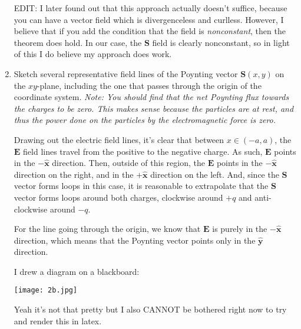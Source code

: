 \documentclass[10pt]{article}
\begin{document}
\begin{enumerate}[label=(\alph*)]
\begin{solution}
				EDIT: I later found out that this approach actually doesn't suffice, because you can have a
				vector field which is divergenceless and curlless. However, I believe that if you add the
				condition that the field is \textit{nonconstant}, then the theorem does hold. In our case,
				the \( \mathbf{S} \) field is clearly nonconstant, so in light of this I do believe my
				approach does work.  
			\end{solution}
		\item Sketch several representative field lines of the Poynting vector \( \mathbf{S}(x, y) \) on the
			\( xy \)-plane, including the one that passes through the origin of the coordinate system.
			\textit{Note: You should find that the net Poynting flux towards the charges to be zero. This
				makes sense because the particles are at rest, and thus the power done on the particles by
			the electromagnetic force is zero.}

			\begin{solution}
				Drawing out the electric field lines, it's clear that between \( x \in (-a, a) \), the \(
				\mathbf{E} \) field lines travel from the positive to the negative charge. As such, \(
				\mathbf{E} \) points in the \( -\hat{\mathbf{x}} \) direction. Then, outside of this region,
				the \( \mathbf{E} \) points in the \( -\hat{\mathbf{x}} \) direction on the right, and in the
				\( +\hat{\mathbf{x}} \) direction on the left. And, since the \( \mathbf{S} \) vector forms
				loops in this case, it is reasonable to extrapolate that the \( \mathbf{S} \) vector forms
				loops around both charges, clockwise around \( +q \) and anti-clockwise around \( -q \). 

				For the line going through the origin, we know that \( \mathbf{E} \) is purely in the \(
				-\hat{\mathbf{x}} \) direction, which means that the Poynting vector points only in the \(
				\hat{\mathbf{y}} \) direction. 

				I drew a diagram on a blackboard:
				\begin{center}
					\texttt{[image: 2b.jpg]}
				\end{center}
				Yeah it's not that pretty but I also CANNOT be bothered right now to try and render this in
				latex. 
			\end{solution}
	\end{enumerate}


	\pagebreak
\end{document}
